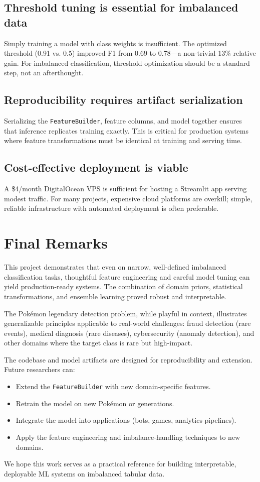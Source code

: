 \subsection{Threshold tuning is essential for imbalanced data}

Simply training a model with class weights is insufficient. The optimized threshold (0.91 vs. 0.5) improved F1 from 0.69 to 0.78—a non-trivial 13\% relative gain. For imbalanced classification, threshold optimization should be a standard step, not an afterthought.

\subsection{Reproducibility requires artifact serialization}

Serializing the \texttt{FeatureBuilder}, feature columns, and model together ensures that inference replicates training exactly. This is critical for production systems where feature transformations must be identical at training and serving time.

\subsection{Cost-effective deployment is viable}

A \$4/month DigitalOcean VPS is sufficient for hosting a Streamlit app serving modest traffic. For many projects, expensive cloud platforms are overkill; simple, reliable infrastructure with automated deployment is often preferable.

\section{Final Remarks}
\label{sec:final_remarks}

This project demonstrates that even on narrow, well-defined imbalanced classification tasks, thoughtful feature engineering and careful model tuning can yield production-ready systems. The combination of domain priors, statistical transformations, and ensemble learning proved robust and interpretable.

The Pokémon legendary detection problem, while playful in context, illustrates generalizable principles applicable to real-world challenges: fraud detection (rare events), medical diagnosis (rare diseases), cybersecurity (anomaly detection), and other domains where the target class is rare but high-impact.

The codebase and model artifacts are designed for reproducibility and extension. Future researchers can:
\begin{itemize}
  \item Extend the \texttt{FeatureBuilder} with new domain-specific features.
  \item Retrain the model on new Pokémon or generations.
  \item Integrate the model into applications (bots, games, analytics pipelines).
  \item Apply the feature engineering and imbalance-handling techniques to new domains.
\end{itemize}

We hope this work serves as a practical reference for building interpretable, deployable ML systems on imbalanced tabular data.
